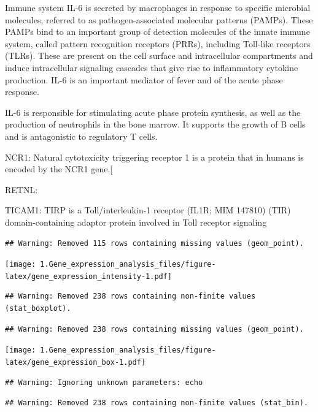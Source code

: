 \documentclass[
]{article}
\begin{document}
Immune system IL-6 is secreted by macrophages in response to specific
microbial molecules, referred to as pathogen-associated molecular
patterns (PAMPs). These PAMPs bind to an important group of detection
molecules of the innate immune system, called pattern recognition
receptors (PRRs), including Toll-like receptors (TLRs). These are
present on the cell surface and intracellular compartments and induce
intracellular signaling cascades that give rise to inflammatory cytokine
production. IL-6 is an important mediator of fever and of the acute
phase response.

IL-6 is responsible for stimulating acute phase protein synthesis, as
well as the production of neutrophils in the bone marrow. It supports
the growth of B cells and is antagonistic to regulatory T cells.

NCR1: Natural cytotoxicity triggering receptor 1 is a protein that in
humans is encoded by the NCR1 gene.{[}

RETNL:

TICAM1: TIRP is a Toll/interleukin-1 receptor (IL1R; MIM 147810) (TIR)
domain-containing adaptor protein involved in Toll receptor signaling

\begin{verbatim}
## Warning: Removed 115 rows containing missing values (geom_point).
\end{verbatim}

\texttt{[image: 1.Gene\_expression\_analysis\_files/figure-latex/gene\_expression\_intensity-1.pdf]}

\begin{verbatim}
## Warning: Removed 238 rows containing non-finite values (stat_boxplot).
\end{verbatim}

\begin{verbatim}
## Warning: Removed 238 rows containing missing values (geom_point).
\end{verbatim}

\texttt{[image: 1.Gene\_expression\_analysis\_files/figure-latex/gene\_expression\_box-1.pdf]}

\begin{verbatim}
## Warning: Ignoring unknown parameters: echo
\end{verbatim}

\begin{verbatim}
## Warning: Removed 238 rows containing non-finite values (stat_bin).
\end{verbatim}
\end{document}
